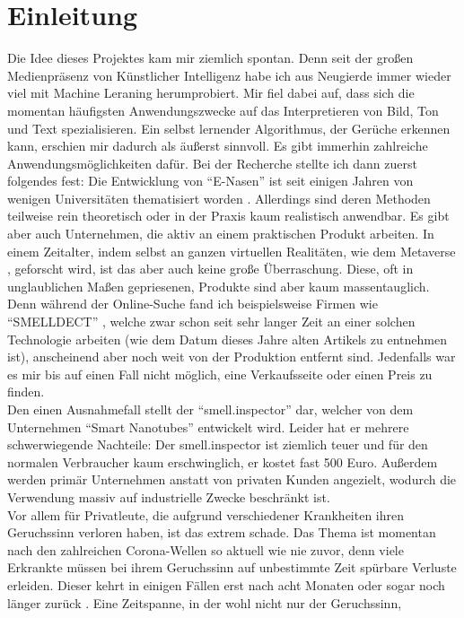 \documentclass[10pt]{article}
\begin{document}
\section{Einleitung}
Die Idee dieses Projektes kam mir ziemlich spontan. Denn seit der großen Medienpräsenz von Künstlicher Intelligenz habe ich aus Neugierde immer wieder viel mit Machine Leraning 
herumprobiert. Mir fiel dabei auf, dass sich die momentan häufigsten Anwendungszwecke auf das Interpretieren von Bild, Ton und Text spezialisieren. Ein selbst lernender Algorithmus, 
der Gerüche erkennen kann, erschien mir dadurch als äußerst sinnvoll. Es gibt immerhin zahlreiche Anwendungsmöglichkeiten dafür. Bei der Recherche stellte ich dann zuerst folgendes fest: 
Die Entwicklung von "`E-Nasen"' ist seit einigen Jahren von wenigen Universitäten thematisiert worden \autocite{E-Nase:1} \autocite{E-Nase:2}. Allerdings sind deren Methoden teilweise rein
theoretisch oder in der Praxis kaum realistisch anwendbar. Es gibt aber auch Unternehmen, die aktiv an einem praktischen Produkt arbeiten.
In einem Zeitalter, indem selbst an ganzen virtuellen Realitäten, wie dem Metaverse \autocite{Metaverse}, geforscht wird, ist das aber auch keine große Überraschung.
Diese, oft in unglaublichen Maßen gepriesenen, Produkte sind aber kaum massentauglich. Denn während der Online-Suche fand ich beispielsweise Firmen wie
"`SMELLDECT"' \autocite{SMELLDECT}, welche zwar schon seit sehr langer Zeit an einer solchen Technologie arbeiten
(wie dem Datum dieses \autocite{SMELLDECT:Article} Jahre alten Artikels zu entnehmen ist), anscheinend aber noch weit von der Produktion entfernt sind. 
Jedenfalls war es mir bis auf einen Fall nicht möglich, eine Verkaufsseite oder einen Preis zu finden.\\
Den einen Ausnahmefall stellt der "`smell.inspector"' \autocite{NanoTubesNose} dar, welcher von dem Unternehmen "`Smart Nanotubes"' entwickelt wird. 
Leider hat er mehrere schwerwiegende Nachteile: Der smell.inspector ist ziemlich teuer und für den normalen Verbraucher 
kaum erschwinglich, er kostet fast 500 Euro. Außerdem werden primär Unternehmen anstatt von privaten Kunden angezielt, wodurch die Verwendung massiv auf 
industrielle Zwecke beschränkt ist.\\
Vor allem für Privatleute, die aufgrund verschiedener Krankheiten ihren Geruchssinn verloren haben, ist das extrem schade.
Das Thema ist momentan nach den zahlreichen Corona-Wellen so aktuell wie nie zuvor, denn viele Erkrankte müssen bei ihrem Geruchssinn auf unbestimmte Zeit spürbare Verluste erleiden. 
Dieser kehrt in einigen Fällen erst nach acht Monaten oder sogar noch länger zurück \autocite{Geruchsstoerungen}. Eine Zeitspanne, in der wohl nicht nur der Geruchssinn,
\end{document}
